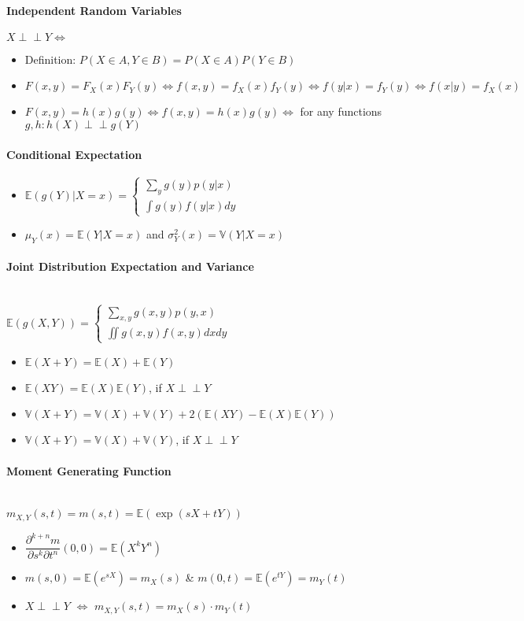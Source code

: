 \documentclass[paper=a4,fontsize=8pt,pagesize,DIV=calc]{scrartcl}
\newcounter{row}
\def\Perp{\perp\!\!\!\perp}
\begin{document}
\begin{multicols}{3}
\paragraph{Independent Random Variables} $X \Perp Y \Leftrightarrow$
\begin{itemize}
\item Definition: $P(X\in A, Y \in B)=P(X\in A)P(Y\in B)$
\item $F(x,y)=F_X(x)F_Y(y)\Leftrightarrow f(x,y)=f_X(x)f_Y(y)\Leftrightarrow f(y|x)=f_Y(y)\Leftrightarrow f(x|y)=f_X(x)$
\item $F(x,y)=h(x)g(y)\Leftrightarrow f(x,y)=h(x)g(y)\Leftrightarrow$ for any functions $g,h: h(X)\Perp g(Y)$
\end{itemize}
\paragraph{Conditional Expectation}
\begin{itemize}
\item $\mathbb{E}(g(Y)|X=x)=\left\{ 
\begin{array}{l} \sum_y g(y) p(y|x) \\ 
\int g(y) f(y|x)dy \end{array} \right.$
\item $\mu_Y(x)=\mathbb{E}(Y|X=x)$ and $\sigma^2_Y(x)=\mathbb{V}(Y|X=x)$
\end{itemize}
\paragraph{Joint Distribution Expectation and Variance}
~~\\$\mathbb{E}(g(X,Y))=\left\{ 
\begin{array}{l} \sum_{x,y} g(x,y) p(y,x) \\ 
\iint g(x,y) f(x,y)dxdy \end{array} \right.$
\begin{itemize}
\item $\mathbb{E}(X+Y)=\mathbb{E}(X)+\mathbb{E}(Y)$
\item $\mathbb{E}(XY)=\mathbb{E}(X)\mathbb{E}(Y)$, if $X \Perp Y$
\item $\mathbb{V}(X+Y)=\mathbb{V}(X)+\mathbb{V}(Y)+2(\mathbb{E}(XY)-\mathbb{E}(X)\mathbb{E}(Y))$
\item $\mathbb{V}(X+Y)=\mathbb{V}(X)+\mathbb{V}(Y)$, if $X \Perp Y$
\end{itemize}
\paragraph{Moment Generating Function}
~~\\$m_{X,Y}(s,t)=m(s,t)=\mathbb{E}(\exp(sX+tY))$
\begin{itemize}
\item $\dfrac{\partial^{k+n}m}{\partial s^k \partial t^n}(0,0)= \mathbb{E}(X^kY^n)$
\item $m(s,0)=\mathbb{E}(e^{sX})=m_X(s)$ \& $m(0,t)=\mathbb{E}(e^{tY})=m_Y(t)$
\item $X \Perp Y$ $\Leftrightarrow$ $m_{X,Y}(s,t)=m_{X}(s) \cdot m_{Y}(t)$
\end{itemize}

\end{multicols}
\end{document}

